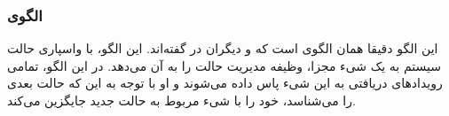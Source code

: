 \subsubsection{الگوی }
\label{smStateSec}
\begin{RTL}
این الگو دقیقا همان الگوی  است که  و دیگران
در \cite{ref3} گفته‌اند. این الگو، با واسپاری حالت سیستم به یک شیء
مجزا، وظیفه مدیریت حالت را به آن می‌دهد. در این الگو، تمامی رویدادهای دریافتی
به این شیء پاس داده می‌شوند و او با توجه به این که حالت بعدی را می‌شناسد،
خود را با شیء مربوط به حالت جدید جایگزین می‌کند.
\end{RTL}